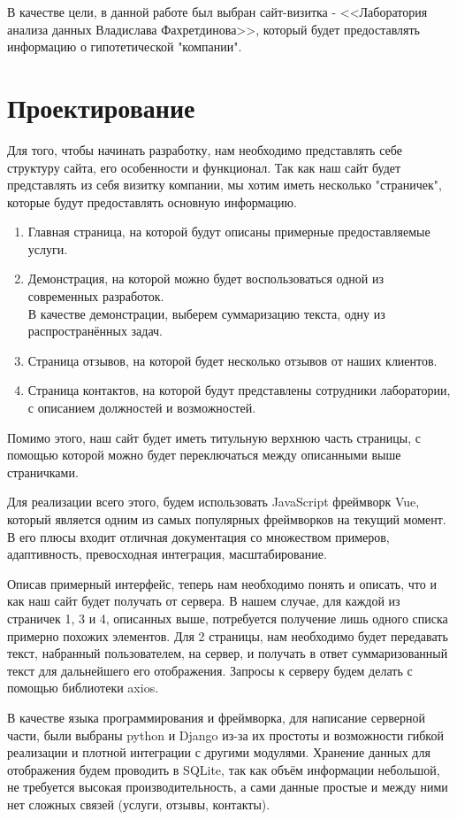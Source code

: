 \documentclass{article}
\begin{document}
В качестве цели, в данной работе был выбран сайт-визитка - <<Лаборатория анализа данных Владислава Фахретдинова>>, который будет предоставлять информацию о гипотетической "компании".

\section{Проектирование}
Для того, чтобы начинать разработку, нам необходимо представлять себе структуру сайта, его особенности и функционал. 
Так как наш сайт будет представлять из себя визитку компании, мы хотим иметь несколько "страничек", которые будут предоставлять основную информацию.
\begin{enumerate}
    \item Главная страница, на которой будут описаны примерные предоставляемые услуги.
    \item Демонстрация, на которой можно будет воспользоваться одной из современных разработок. \\ 
          В качестве демонстрации, выберем суммаризацию текста, одну из распространённых задач.
    \item Страница отзывов, на которой будет несколько отзывов от наших клиентов.
    \item Страница контактов, на которой будут представлены сотрудники лаборатории, с описанием должностей и возможностей.
\end{enumerate}
Помимо этого, наш сайт будет иметь титульную верхнюю часть страницы, с помощью которой можно будет переключаться между описанными выше страничками.

Для реализации всего этого, будем использовать JavaScript фреймворк Vue, который является одним из самых популярных фреймворков на текущий момент. В его плюсы входит отличная документация со множеством примеров, адаптивность, превосходная интеграция, масштабирование.

Описав примерный интерфейс, теперь нам необходимо понять и описать, что и как наш сайт будет получать от сервера. В нашем случае, для каждой из страничек 1, 3 и 4, описанных выше, потребуется получение лишь одного списка примерно похожих элементов. Для 2 страницы, нам необходимо будет передавать текст, набранный пользователем, на сервер, и получать в ответ суммаризованный текст для дальнейшего его отображения. Запросы к серверу будем делать с помощью библиотеки axios.

В качестве языка программирования и фреймворка, для написание серверной части, были выбраны python и Django из-за их простоты и возможности гибкой реализации и плотной интеграции с другими модулями.
Хранение данных для отображения будем проводить в SQLite, так как объём информации небольшой, не требуется высокая производительность, а сами данные простые и между ними нет сложных связей (услуги, отзывы, контакты).
\end{document}
